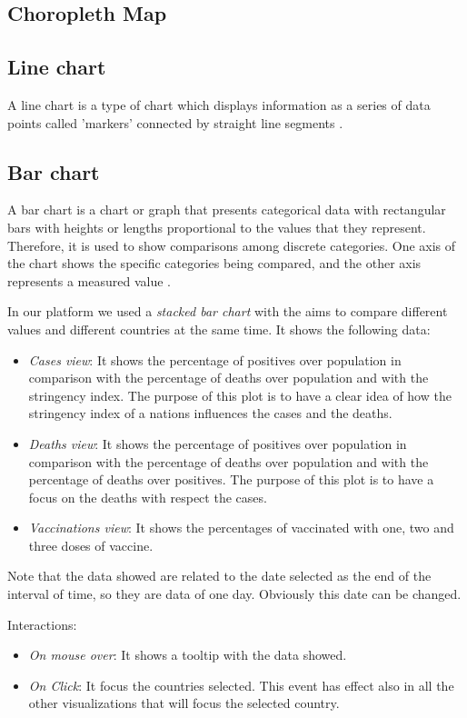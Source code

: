 \documentclass[10pt,conference]{IEEEtran}
\begin{document}
\subsection{Choropleth Map}

\subsection{Line chart}
A line chart is a type of chart which displays information as a series of data points called ’markers’ connected by straight 
line segments \cite{line}.

\subsection{Bar chart}
A bar chart is a chart or graph that presents categorical data with rectangular bars with heights or lengths proportional 
to the values that they represent. Therefore, it is used to show comparisons among discrete categories. One axis of the chart 
shows the specific categories being compared, and the other axis represents a measured value \cite{barchart}.

In our platform we used a {\em stacked bar chart} with the aims to compare different values and different countries at the same time. 
It shows the following data:
\begin{itemize}
	\item {\em Cases view}: It shows the percentage of positives over population in comparison with the percentage of deaths over population and with the stringency index. The purpose of this plot is to have a clear idea of how the stringency index of a nations influences the cases and the deaths.
	\item {\em Deaths view}: It shows the percentage of positives over population in comparison with the percentage of deaths over population and with the percentage of deaths over positives. The purpose of this plot is to have a focus on the deaths with respect the cases.
	\item {\em Vaccinations view}: It shows the percentages of vaccinated with one, two and three doses of vaccine.
\end{itemize}

Note that the data showed are related to the date selected as the end of the interval of time, so they are data of one day. Obviously this date can be changed.

Interactions:
\begin{itemize}
	\item {\em On mouse over}: It shows a tooltip with the data showed.
	\item {\em On Click}: It focus the countries selected. This event has effect also in all the other visualizations that will focus the selected country.
\end{itemize}
\end{document}
